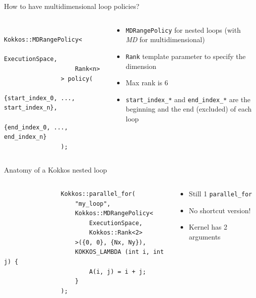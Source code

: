 \documentclass[aspectratio=169]{beamer}
\begin{document}
\begin{frame}[fragile]{How to have multidimensional loop policies?}
    \begin{columns}
        \begin{column}{0.6\linewidth}
            \begin{verbatim}
                Kokkos::MDRangePolicy<
                    ExecutionSpace,
                    Rank<n>
                > policy(
                    {start_index_0, ..., start_index_n},
                    {end_index_0, ..., end_index_n}
                );
            \end{verbatim}
        \end{column}
        \begin{column}{0.4\linewidth}
            \begin{itemize}
                \item \texttt{MDRangePolicy} for nested loops (with \emph{MD} for multidimensional)
                \item \texttt{Rank} template parameter to specify the dimension
                \item Max rank is 6
                \item \texttt{start\_index\_*} and \texttt{end\_index\_*} are the beginning and the end (excluded) of each loop
            \end{itemize}
        \end{column}
    \end{columns}
\end{frame}


\begin{frame}[fragile]{Anatomy of a Kokkos nested loop}
    \begin{columns}
        \begin{column}{0.6\linewidth}
            \begin{verbatim}
                Kokkos::parallel_for(
                    "my_loop",
                    Kokkos::MDRangePolicy<
                        ExecutionSpace,
                        Kokkos::Rank<2>
                    >({0, 0}, {Nx, Ny}),
                    KOKKOS_LAMBDA (int i, int j) {
                        A(i, j) = i + j;
                    }
                );
            \end{verbatim}
        \end{column}
        \begin{column}{0.4\linewidth}
            \begin{itemize}
                \item Still 1 \texttt{parallel\_for}
                \item No shortcut version!
                \item Kernel has 2 arguments
            \end{itemize}
        \end{column}
    \end{columns}
\end{frame}
\end{document}
